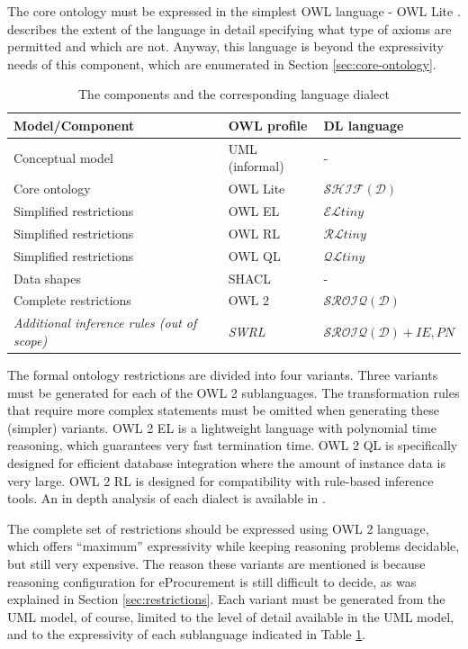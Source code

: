 	The core ontology must be expressed in the simplest OWL language - OWL Lite \cite{owl1}. \citep[Sec.8.3]{owl1} describes the extent of the language in detail specifying what type of axioms are permitted and which are not. Anyway, this language is beyond the expressivity needs of this component, which are enumerated in Section \ref{sec:core-ontology}.
	
	\begin{table}[!ht]
		\centering
		\begin{tabular}{@{}lll@{}}
			\toprule
			Model/Component         & OWL profile    & DL language \\ \midrule
			Conceptual model        & UML (informal) & -           \\
			Core ontology           & OWL Lite       & $\mathcal{SHIF(D)}$     \\
			Simplified restrictions & OWL EL         & $\mathcal{EL}tiny$      \\
			Simplified restrictions & OWL RL         & $\mathcal{RL}tiny$      \\
			Simplified restrictions & OWL QL         & $\mathcal{QL}tiny$      \\
			Data shapes             & SHACL          & -           \\
			Complete restrictions   & OWL 2          & $\mathcal{SROIQ(D)}$    \\
			\textit{Additional inference rules (out of scope)} & \textit{SWRL} & \textit{$\mathcal{SROIQ(D)} + IE, PN$} \\ \bottomrule
		\end{tabular}
		\caption{The components and the corresponding language dialect}
		\label{tab:expressivity}
	\end{table}
	
	The formal ontology restrictions are divided into four variants. Three variants must be generated for each of the OWL 2 sublanguages. The transformation rules that require more complex statements must be omitted when generating these (simpler) variants. OWL 2 EL is a lightweight language with polynomial time reasoning, which guarantees very fast termination time. OWL 2 QL is specifically designed for efficient database integration where the amount of instance data is very large. OWL 2 RL is designed for compatibility with rule-based inference tools. An in depth analysis of each dialect is available in \citep{krotzsch2012owl}.
		
	The complete set of restrictions should be expressed using OWL 2 language, which offers ``maximum'' expressivity while keeping reasoning problems decidable, but still very expensive. The reason these variants are mentioned is because reasoning configuration for eProcurement is still difficult to decide, as was explained in Section \ref{sec:restrictions}. Each variant must be generated from the UML model, of course, limited to the level of detail available in the UML model, and to the expressivity of each sublanguage indicated in Table \ref{tab:expressivity}.
	
